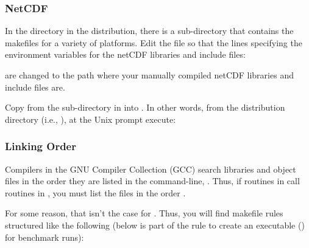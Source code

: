 	\subsubsection{NetCDF}

In the  directory in the  distribution, there is a
sub-directory  that contains the makefiles for a
variety of platforms.  Edit the file 
so that the lines specifying the environment variables for the
netCDF libraries and include files:

\begin{codeblock}
\end{codeblock}

are changed to the path where your manually compiled
netCDF libraries and include files are.

Copy  from the  sub-directory
in  into .  
In other words, from the  distribution directory
(i.e., ), at the Unix prompt execute:

\begin{codeblock}
\end{codeblock}


	\subsubsection{Linking Order}

Compilers in the GNU Compiler Collection (GCC) search libraries
and object files in the order they are listed in the command-line,
%
	{}.
Thus, if routines in  call routines in , 
you must list the files in the order .

For some reason, that isn't the case for .  Thus, you will
find  makefile rules structured like the following
(below is part of the rule to create an executable () for
benchmark runs):

%
\begin{latexonly}
\begin{codeblock}
\end{codeblock}
\end{latexonly}

